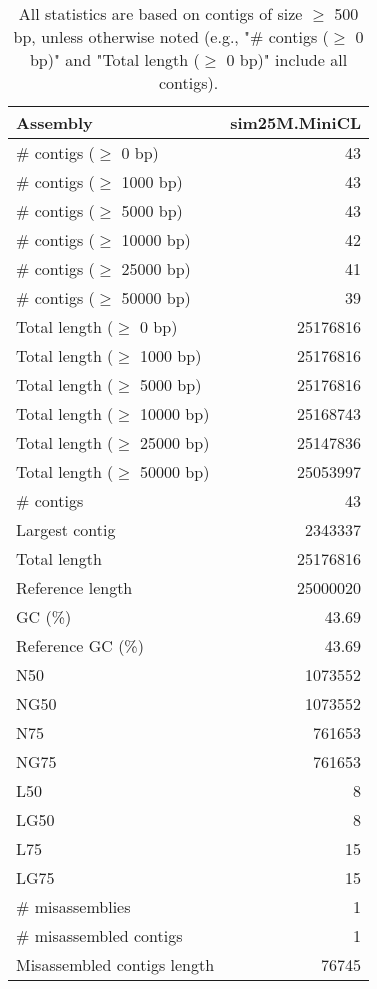 \documentclass[12pt,a4paper]{article}
\begin{document}
\begin{table}[ht]
\begin{center}
\caption{All statistics are based on contigs of size $\geq$ 500 bp, unless otherwise noted (e.g., "\# contigs ($\geq$ 0 bp)" and "Total length ($\geq$ 0 bp)" include all contigs).}
\begin{tabular}{|l*{1}{|r}|}
\hline
Assembly & sim25M.MiniCL \\ \hline
\# contigs ($\geq$ 0 bp) & 43 \\ \hline
\# contigs ($\geq$ 1000 bp) & 43 \\ \hline
\# contigs ($\geq$ 5000 bp) & 43 \\ \hline
\# contigs ($\geq$ 10000 bp) & 42 \\ \hline
\# contigs ($\geq$ 25000 bp) & 41 \\ \hline
\# contigs ($\geq$ 50000 bp) & 39 \\ \hline
Total length ($\geq$ 0 bp) & 25176816 \\ \hline
Total length ($\geq$ 1000 bp) & 25176816 \\ \hline
Total length ($\geq$ 5000 bp) & 25176816 \\ \hline
Total length ($\geq$ 10000 bp) & 25168743 \\ \hline
Total length ($\geq$ 25000 bp) & 25147836 \\ \hline
Total length ($\geq$ 50000 bp) & 25053997 \\ \hline
\# contigs & 43 \\ \hline
Largest contig & 2343337 \\ \hline
Total length & 25176816 \\ \hline
Reference length & 25000020 \\ \hline
GC (\%) & 43.69 \\ \hline
Reference GC (\%) & 43.69 \\ \hline
N50 & 1073552 \\ \hline
NG50 & 1073552 \\ \hline
N75 & 761653 \\ \hline
NG75 & 761653 \\ \hline
L50 & 8 \\ \hline
LG50 & 8 \\ \hline
L75 & 15 \\ \hline
LG75 & 15 \\ \hline
\# misassemblies & 1 \\ \hline
\# misassembled contigs & 1 \\ \hline
Misassembled contigs length & 76745 \\ \hline

\end{tabular}
\end{center}
\end{table}
\end{document}
